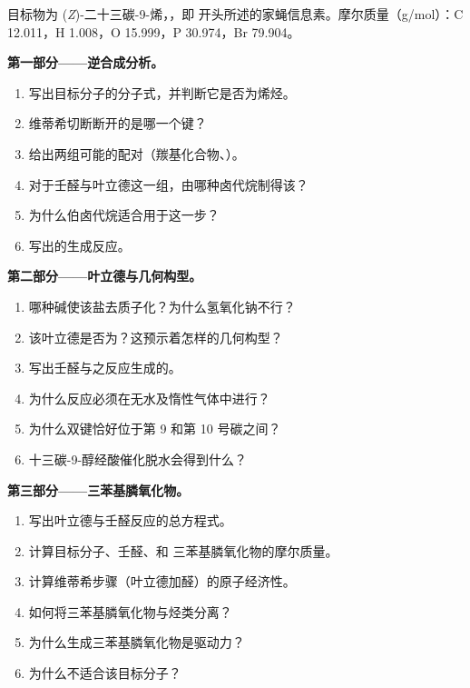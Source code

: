 \begin{problem}
\label{pb:b2:wittig:1}
目标物为 (\textit{Z})-二十三碳-9-烯，，即
开头所述的家蝇信息素。摩尔质量（\unit{g/mol}）：C 12.011，H 1.008，O 15.999，P 30.974，Br 79.904。

\medskip
\noindent\textbf{第一部分——逆合成分析。}
\begin{enumerate}
  \item 写出目标分子的分子式，并判断它是否为烯烃。
  \item 维蒂希切断断开的是哪一个键？
  \item 给出两组可能的配对（羰基化合物、）。
  \item 对于壬醛与叶立德这一组，由哪种卤代烷制得该？
  \item 为什么伯卤代烷适合用于这一步？
  \item 写出的生成反应。
\end{enumerate}

\medskip
\noindent\textbf{第二部分——叶立德与几何构型。}
\begin{enumerate}[resume]
  \item 哪种碱使该盐去质子化？为什么氢氧化钠不行？
  \item 该叶立德是否为？这预示着怎样的几何构型？
  \item 写出壬醛与之反应生成的。
  \item 为什么反应必须在无水及惰性气体中进行？
  \item 为什么双键恰好位于第 9 和第 10 号碳之间？
  \item 十三碳-9-醇经酸催化脱水会得到什么？
\end{enumerate}

\medskip
\noindent\textbf{第三部分——三苯基膦氧化物。}
\begin{enumerate}[resume]
  \item 写出叶立德与壬醛反应的总方程式。
  \item 计算目标分子、壬醛、和
        三苯基膦氧化物的摩尔质量。
  \item 计算维蒂希步骤（叶立德加醛）的原子经济性。
  \item 如何将三苯基膦氧化物与烃类分离？
  \item 为什么生成三苯基膦氧化物是驱动力？
  \item 为什么不适合该目标分子？
\end{enumerate}


\end{problem}
